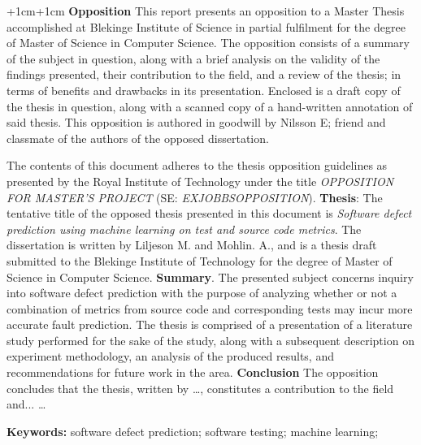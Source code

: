 
\abstract
\begin{changemargin}{+1cm}{+1cm}
\noindent
\textbf{Opposition}
This report presents an opposition to a Master Thesis accomplished at Blekinge Institute of Science in partial fulfilment for the degree of Master of Science in Computer Science.
The opposition consists of a summary of the subject in question, along with a brief analysis on the validity of the findings presented, their contribution to the field, and a review of the thesis; in terms of benefits and drawbacks in its presentation.
Enclosed is a draft copy of the thesis in question, along with a scanned copy of a hand-written annotation of said thesis.
This opposition is authored in goodwill by Nilsson E; friend and classmate of the authors of the opposed dissertation.

The contents of this document adheres to the thesis opposition guidelines as presented by the Royal Institute of Technology under the title \textit{OPPOSITION FOR MASTER'S PROJECT} (SE: \textit{EXJOBBSOPPOSITION}).
\newline
\textbf{Thesis}: The tentative title of the opposed thesis presented in this document is \textit{Software defect prediction using machine learning on test and source code metrics}.
The dissertation is written by Liljeson M. and Mohlin. A., and is a thesis draft submitted to the Blekinge Institute of Technology for the degree of Master of Science in Computer Science.
\newline
\textbf{Summary}.
The presented subject concerns inquiry into software defect prediction with the purpose of analyzing whether or not a combination of metrics from source code and corresponding tests may incur more accurate fault prediction.
The thesis is comprised of a presentation of a literature study performed for the sake of the study, along with a subsequent description on experiment methodology, an analysis of the produced results, and recommendations for future work in the area.
\newline
\textbf{Conclusion}
The opposition concludes that the thesis, written by \ldots, constitutes a contribution to the field and...
\ldots

\par\vspace {0.5cm}
\noindent
\textbf{Keywords:} software defect prediction; software testing; machine learning;

\end{changemargin}
